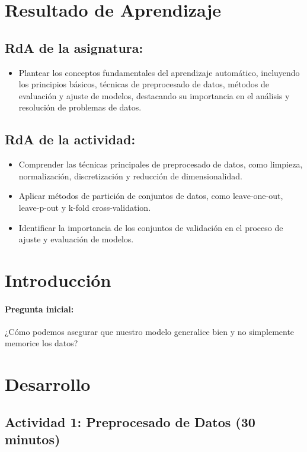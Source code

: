 \documentclass[a4,11pt]{aleph-notas}
\begin{document}
\encabezado


\section*{Resultado de Aprendizaje}

\subsection*{RdA de la asignatura:}
\begin{itemize}
    \item Plantear los conceptos fundamentales del aprendizaje automático, incluyendo los principios básicos, técnicas de preprocesado de datos, métodos de evaluación y ajuste de modelos, destacando su importancia en el análisis y resolución de problemas de datos.
\end{itemize}

\subsection*{RdA de la actividad:}
\begin{itemize}
    \item Comprender las técnicas principales de preprocesado de datos, como limpieza, normalización, discretización y reducción de dimensionalidad.
    \item Aplicar métodos de partición de conjuntos de datos, como leave-one-out, leave-p-out y k-fold cross-validation.
    \item Identificar la importancia de los conjuntos de validación en el proceso de ajuste y evaluación de modelos.
\end{itemize}

\section*{Introducción}

\paragraph{Pregunta inicial:} 
¿Cómo podemos asegurar que nuestro modelo generalice bien y no simplemente memorice los datos?


\section*{Desarrollo}

\subsection*{Actividad 1: Preprocesado de Datos (30 minutos)}  
\end{document}
